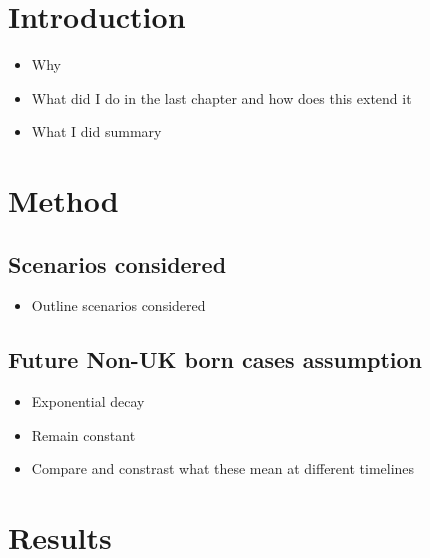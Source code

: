 \documentclass[11pt,twoside]{bristolthesis}
\providecommand{\tightlist}{%
  \setlength{\itemsep}{0pt}\setlength{\parskip}{0pt}}
\begin{document}
  \hypertarget{introduction-9}{%
  \section{Introduction}\label{introduction-9}}
  \begin{itemize}
  \tightlist
  \item
    Why
  \item
    What did I do in the last chapter and how does this extend it
  \item
    What I did summary
  \end{itemize}
  \hypertarget{method-4}{%
  \section{Method}\label{method-4}}
  
  \hypertarget{scenarios-considered}{%
  \subsection{Scenarios considered}\label{scenarios-considered}}
  \begin{itemize}
  \tightlist
  \item
    Outline scenarios considered
  \end{itemize}
  \hypertarget{future-non-uk-born-cases-assumption}{%
  \subsection{Future Non-UK born cases assumption}\label{future-non-uk-born-cases-assumption}}
  \begin{itemize}
  \tightlist
  \item
    Exponential decay
  \item
    Remain constant
  \item
    Compare and constrast what these mean at different timelines
  \end{itemize}
  \hypertarget{results-3}{%
  \section{Results}\label{results-3}}
  
\end{document}
